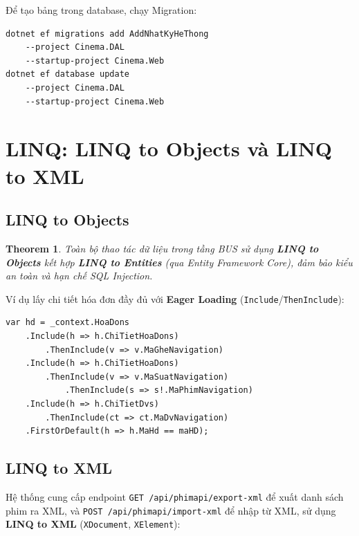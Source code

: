 \documentclass[12pt,a4paper,oneside]{book}
\theoremstyle{plain}
\newtheorem{thm}{Theorem}[chapter]
\numberwithin{equation}{chapter}
\begin{document}
\noindent Để tạo bảng trong database, chạy Migration:
\begin{lstlisting}[style=sqlstyle, caption={Lệnh Migration Code First}]
dotnet ef migrations add AddNhatKyHeThong 
    --project Cinema.DAL 
    --startup-project Cinema.Web
dotnet ef database update 
    --project Cinema.DAL 
    --startup-project Cinema.Web
\end{lstlisting}

\section{LINQ: LINQ to Objects và LINQ to XML}\label{Sec4.2}

\subsection{LINQ to Objects}\label{sub4.2.1}

\begin{thm}\label{thmlinq}
    Toàn bộ thao tác dữ liệu trong tầng BUS sử dụng \textbf{LINQ to Objects} kết hợp \textbf{LINQ to Entities} (qua Entity Framework Core), đảm bảo kiểu an toàn và hạn chế SQL Injection.
\end{thm}

\noindent Ví dụ lấy chi tiết hóa đơn đầy đủ với \textbf{Eager Loading} (\texttt{Include}/\texttt{ThenInclude}):

\begin{lstlisting}[style=csharpstyle, caption={LINQ Eager Loading trong \texttt{HoaDonBUS.LayChiTietHoaDonFull()}}]
var hd = _context.HoaDons
    .Include(h => h.ChiTietHoaDons)
        .ThenInclude(v => v.MaGheNavigation)
    .Include(h => h.ChiTietHoaDons)
        .ThenInclude(v => v.MaSuatNavigation)
            .ThenInclude(s => s!.MaPhimNavigation)
    .Include(h => h.ChiTietDvs)
        .ThenInclude(ct => ct.MaDvNavigation)
    .FirstOrDefault(h => h.MaHd == maHD);
\end{lstlisting}

\subsection{LINQ to XML}\label{sub4.2.2}

\noindent Hệ thống cung cấp endpoint \texttt{GET /api/phimapi/export-xml} để xuất danh sách phim ra XML, và \texttt{POST /api/phimapi/import-xml} để nhập từ XML, sử dụng \textbf{LINQ to XML} (\texttt{XDocument}, \texttt{XElement}):
\end{document}
